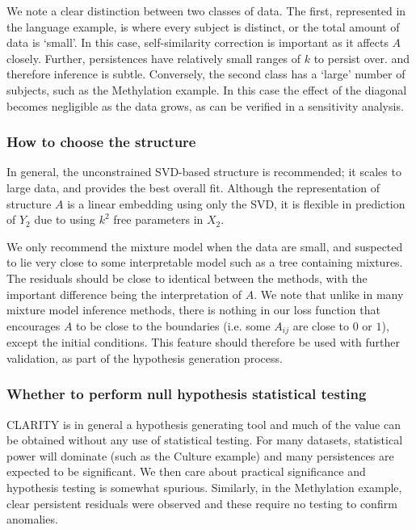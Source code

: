 \documentclass[a4]{article}
\newcommand{\+}[1]{\mathbf{#1}}
\begin{document}
We note a clear distinction between two classes of data. The first, represented in the language example, is where every subject is distinct, or the total amount of data is `small'.  In this case, self-similarity correction is important as it affects $A$ closely. Further, persistences have relatively small ranges of $k$ to persist over. and therefore inference is subtle. Conversely, the second class has a `large' number of subjects, such as the Methylation example. In this case the effect of the diagonal becomes negligible as the data grows, as can be verified in a sensitivity analysis.

\subsubsection{How to choose the structure}

In general, the unconstrained SVD-based structure is recommended; it scales to large data, and provides the best overall fit. Although the representation of structure $A$ is a linear embedding using only the SVD, it is flexible in prediction of $Y_2$ due to using $k^2$ free parameters in $X_2$.

We only recommend the mixture model when the data are small, and suspected to lie very close to some interpretable model such as a tree containing mixtures. The residuals should be close to identical between the methods, with the important difference being the interpretation of $A$. We note that unlike in many mixture model inference methods, there is nothing in our loss function that encourages $A$ to be close to the boundaries (i.e. some $A_{ij}$ are close to $0$ or $1$), except the initial conditions. This feature should therefore be used with further validation, as part of the hypothesis generation process.

\subsubsection{Whether to perform null hypothesis statistical testing}

CLARITY is in general a hypothesis generating tool and much of the value can be obtained without any use of statistical testing. For many datasets, statistical power will dominate (such as the Culture example) and many persistences are expected to be significant. We then care about practical significance and hypothesis testing is somewhat spurious. Similarly, in the Methylation example, clear persistent residuals were observed and these require no testing to confirm anomalies.
\end{document}
